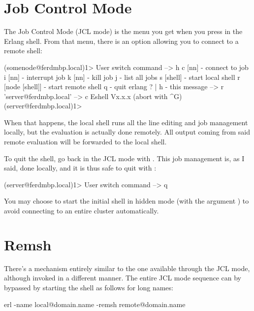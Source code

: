 \documentclass[11pt, oneside]{book}   	%
\begin{document}
\section{Job Control Mode}

The Job Control Mode (JCL mode) is the menu you get when you press  in the Erlang shell. From that menu, there is an option allowing you to connect to a remote shell:

\begin{VerbatimEshell}
(somenode@ferdmbp.local)1>
User switch command
 --> h
  c [nn]            - connect to job
  i [nn]            - interrupt job
  k [nn]            - kill job
  j                 - list all jobs
  s [shell]         - start local shell
  r [node [shell]]  - start remote shell
  q                 - quit erlang
  ? | h             - this message
 --> r 'server@ferdmbp.local'
 --> c
Eshell Vx.x.x  (abort with ^G)
(server@ferdmbp.local)1>
\end{VerbatimEshell}

When that happens, the local shell runs all the line editing and job management locally, but the evaluation is actually done remotely. All output coming from said remote evaluation will be forwarded to the local shell.

To quit the shell, go back in the JCL mode with . This job management is, as I said, done locally, and it is thus safe to quit with :

\begin{VerbatimEshell}
(server@ferdmbp.local)1>
User switch command
 --> q
\end{VerbatimEshell}

You may choose to start the initial shell in hidden mode (with the argument ) to avoid connecting to an entire cluster automatically.

\section{Remsh}

There's a mechanism entirely similar to the one available through the JCL mode, although invoked in a different manner. The entire JCL mode sequence can by bypassed by starting the shell as follows for long names:

\begin{VerbatimText}
erl -name local@domain.name -remsh remote@domain.name
\end{VerbatimText}
\end{document}
